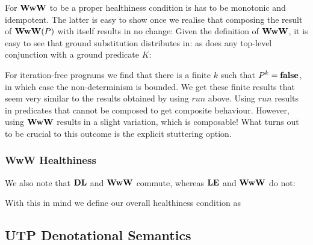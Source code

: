 For $\mathbf{WwW}$ to be a proper healthiness condition
is has to be monotonic and idempotent.
The latter is easy to show once we realise that composing the result
of $\mathbf{WwW}(P)$ with itself results in no change:
Given the definition of $\mathbf{WwW}$, it is easy to see that ground
substitution distributes in:
as does any top-level conjunction with a ground predicate $K$:



For iteration-free programs
we find that there is a finite $k$ such that $P^k = \mathbf{false}$,
in which case the non-determinism is bounded.
We get these finite results that seem very similar
to the results obtained by using $run$ above.
Using $run$ results in predicates that cannot be composed
to get composite behaviour.
However, using $\mathbf{WwW}$ results in a slight variation,
which is composable!
What turns out to be crucial
to this outcome is the explicit stuttering option.

\subsubsection{WwW Healthiness}

We also note that $\mathbf{DL}$ and $\mathbf{WwW}$ commute,
whereas $\mathbf{LE}$ and $\mathbf{WwW}$ do not:

With this in mind we define our overall healthiness condition as

\subsection{UTP Denotational Semantics}\label{ssec:UTP-denote}

